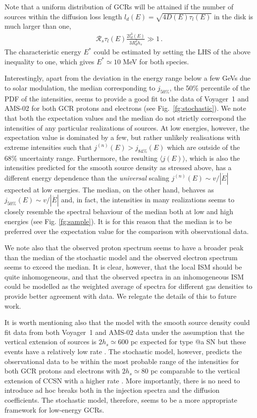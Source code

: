 \documentclass[%
reprint,
amsmath,amssymb,
aps,
superscriptaddress,
preprintnumbers
]{revtex4-2}
\makeatletter
\newcommand*{\rom}[1]{\expandafter\@slowromancap\romannumeral #1@}
\makeatother
\begin{document}
Note that a uniform distribution of GCRs will be attained if the number of sources within the diffusion loss length $l_d(E)=\sqrt{4D(E)\tau_l(E)}$ in the disk is much larger than one,
%
\begin{eqnarray}
\mathcal{R}_s\tau_l(E) \frac{2 l_d^3(E)}{3 R_d^2 h_s}\gg 1 \, .
\end{eqnarray}
%
The characteristic energy $E^*$ could be estimated by setting the LHS of the above inequality to one, which gives $E^*\simeq 10$ MeV for both species. 

Interestingly, apart from the deviation in the energy range below a few GeVs due to solar modulation, the median corresponding to $j_{50\%}$, the 50\% percentile of the PDF of the intensities, seems to provide a good fit to the data of Voyager~1 and AMS-02 for both GCR protons and electrons (see Fig.~\ref{fg:stochastic}). We note that both the expectation values and the median do not strictly correspond the intensities of any particular realizations of sources. At low energies, however, the expectation value is dominated by a few, but rather unlikely realisations with extreme intensities such that $j^{(n)}(E)> j_{84\%}(E)$ which are outside of the 68\% uncertainty range. Furthermore, the resulting $\langle j(E)\rangle$, which is also the intensities predicted for the smooth source density as stressed above, has a different energy dependence than the \textit{universal} scaling $j^{(n)}(E)\sim v/|\dot{E}|$ expected at low energies. The median, on the other hand, behaves as $j_{50\%}(E) \sim v/|\dot{E}|$ and, in fact, the intensities in many realizations seems to closely resemble the spectral behaviour of the median both at low and high energies (see Fig. \ref{fg:sample}). It is for this reason that the median is to be preferred over the expectation value for the comparison with observational data. 

We note also that the observed proton spectrum seems to have a broader peak than the median of the stochastic model and the observed electron spectrum seems to exceed the median. It is clear, however, that the local ISM should be quite inhomogeneous, and that the observed spectra in an inhomogeneous ISM could be modelled as the weighted average of spectra for different gas densities to provide better agreement with data. We relegate the details of this to future work.

It is worth mentioning also that the model with the smooth source density could fit data from both Voyager~1 and AMS-02 data under the assumption that the vertical extension of sources is $2h_{s}\simeq 600$ pc \citep{schlickeiser2014} expected for type \rom{1}a SN but these events have a relatively low rate \citep{prantzos2011}. The stochastic model, however, predicts the observational data to be within the most probable range of the intensities for both GCR protons and electrons with $2h_s\simeq 80$ pc comparable to the vertical extension of CCSN with a higher rate \cite{prantzos2011}. More importantly, there is no need to introduce ad hoc breaks both in the injection spectra and the diffusion coefficients. The stochastic model, therefore, seems to be a more appropriate framework for low-energy GCRs.
\end{document}
